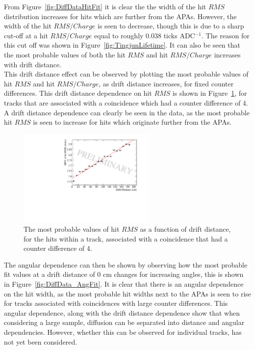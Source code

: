 From Figure~\ref{fig:DiffDataHitFit} it is clear the the width of the hit $RMS$ distribution increases for hits which are further from the APAs. However, the width of the hit $RMS/Charge$ is seen to decrease, though this is due to a sharp cut-off at a hit $RMS/Charge$ equal to roughly 0.038 ticks ADC$^{-1}$. The reason for this cut off was shown in Figure~\ref{fig:TingjunLifetime}. It can also be seen that the most probable values of both the hit $RMS$ and hit $RMS/Charge$ increases with drift distance. \\

This drift distance effect can be observed by plotting the most probable values of hit $RMS$ and hit $RMS/Charge$, as drift distance increases, for fixed counter differences. This drift distance dependence on hit $RMS$ is shown in Figure~\ref{fig:CDiff4DataFit}, for tracks that are associated with a coincidence which had a counter difference of 4. A drift distance dependence can clearly be seen in the data, as the most probable hit $RMS$ is seen to increase for hits which originate further from the APAs. \\

\begin{figure}
  \centering
  \includegraphics[width=0.6\textwidth]{CounterDiff4_Data}
  \caption[The drift distance dependence of diffusion in the 35 ton dataset for coincidences with a counter difference of 4]
          {The most probable values of hit $RMS$ as a function of drift distance, for the hits within a track, associated with a coincidence that had a counter difference of 4.}
  \label{fig:CDiff4DataFit}
\end{figure}

The angular dependence can then be shown by observing how the most probable fit values at a drift distance of 0 cm changes for increasing angles, this is shown in Figure~\ref{fig:DiffData_AngFit}. It is clear that there is an angular dependence on the hit width, as the most probable hit widths next to the APAs is seen to rise for tracks associated with coincidences with large counter differences. This angular dependence, along with the drift distance dependence show that when considering a large sample, diffusion can be separated into distance and angular dependencies. However, whether this can be observed for individual tracks, has not yet been considered. \\

